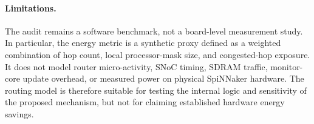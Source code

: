 \paragraph{Limitations.}
The audit remains a software benchmark, not a board-level measurement study. In particular, the energy metric is a synthetic proxy defined as a weighted combination of hop count, local processor-mask size, and congested-hop exposure. It does not model router micro-activity, SNoC timing, SDRAM traffic, monitor-core update overhead, or measured power on physical SpiNNaker hardware. The routing model is therefore suitable for testing the internal logic and sensitivity of the proposed mechanism, but not for claiming established hardware energy savings.
